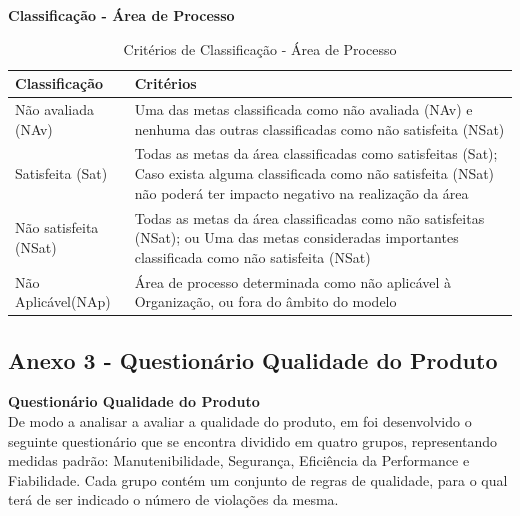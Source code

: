 \documentclass[openany,10pt,a4paper]{article}
\begin{document}
\begin{appendix}
\begin{table}[h]
	\textbf{Classificação - Área de Processo}
		\centering
		\caption{Critérios de Classificação - Área de Processo}
		\begin{tabular}{p{1in}p{5in}}		
			\toprule
			\textbf{Classificação}  & \textbf{Critérios}\\ 
			\midrule
			Não avaliada (NAv) & Uma das metas classificada como não avaliada (NAv) e nenhuma das
			outras classificadas como não satisfeita (NSat) \\
			\midrule
			Satisfeita (Sat) & Todas as metas da área classificadas como satisfeitas (Sat);
			Caso exista alguma classificada como não satisfeita (NSat) não poderá
			ter impacto negativo na realização da área \\
			\midrule
			Não satisfeita (NSat) & Todas as metas da área classificadas como não satisfeitas (NSat); ou
			Uma das metas consideradas importantes classificada como não
			satisfeita (NSat) \\
			\midrule
			Não Aplicável(NAp) & Área de processo determinada como não aplicável à Organização, ou
			fora do âmbito do modelo \\
			\bottomrule
		\end{tabular} 
\end{table}


\subsection{Anexo 3 - Questionário Qualidade do Produto }\label{anexo_produto}
\textbf{Questionário Qualidade do Produto}\\
De modo a analisar a avaliar a qualidade do produto, em foi desenvolvido o seguinte questionário que se encontra dividido em quatro grupos, representando medidas padrão: Manutenibilidade, Segurança, Eficiência da Performance e Fiabilidade.
Cada grupo contém um conjunto de regras de qualidade, para o qual terá de ser indicado o número de violações da mesma.


\end{appendix}
\end{document}
